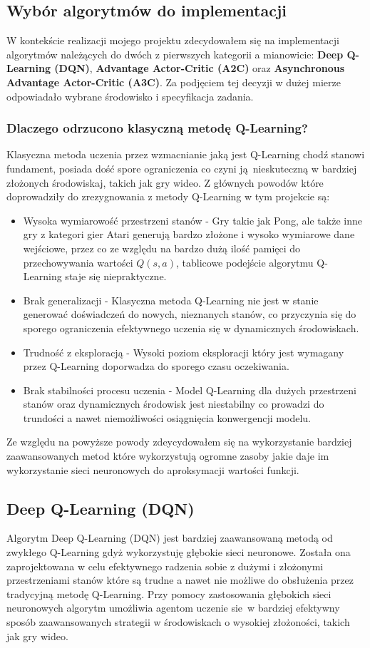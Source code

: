 \documentclass[a4paper, 10pt]{article}
\begin{document}
    \subsection{Wybór algorytmów do implementacji}
    W kontekście realizacji mojego projektu zdecydowałem się na implementacji algorytmów należących do dwóch z pierwszych kategorii a mianowicie:
    \textbf{Deep Q-Learning (DQN)}, \textbf{Advantage Actor-Critic (A2C)} oraz \textbf{Asynchronous Advantage Actor-Critic (A3C)}.
    Za podjęciem tej decyzji w dużej mierze odpowiadało wybrane środowisko i specyfikacja zadania.
    \subsubsection{Dlaczego odrzucono klasyczną metodę Q-Learning?}
    Klasyczna metoda uczenia przez wzmacnianie jaką jest Q-Learning chodź stanowi fundament, posiada dość spore ograniczenia co 
    czyni ją nieskuteczną w bardziej złożonych środowiskaj, takich jak gry wideo. Z głównych powodów które doprowadziły 
    do zrezygnowania z metody Q-Learning w tym projekcie są:
    \begin{itemize}
        \item Wysoka wymiarowość przestrzeni stanów - Gry takie jak Pong, ale także inne gry z kategori gier Atari generują bardzo złożone 
        i wysoko wymiarowe dane wejściowe, przez co ze względu na bardzo dużą ilość pamięci do przechowywania wartości \( Q(s,a) \),
        tablicowe podejście algorytmu Q-Learning staje się niepraktyczne.
        \item Brak generalizacji - Klasyczna metoda Q-Learning nie jest w stanie generować doświadczeń do nowych, nieznanych stanów, co 
        przyczynia się do sporego ograniczenia efektywnego uczenia się w dynamicznych środowiskach.
        \item Trudność z eksploracją - Wysoki poziom eksploracji który jest wymagany przez Q-Learning doporwadza do sporego czasu oczekiwania.
        \item Brak stabilności procesu uczenia - Model Q-Learning dla dużych przestrzeni stanów oraz dynamicznych środowisk jest niestabilny co prowadzi
        do trundości a nawet niemożliwości osiągnięcia konwergencji modelu. 
    \end{itemize}
    Ze względu na powyższe powody zdeycydowałem się na wykorzystanie bardziej zaawansowanych metod które wykorzystują ogromne zasoby jakie daje im 
    wykorzystanie sieci neuronowych do aproksymacji wartości funkcji.
    \subsection{Deep Q-Learning (DQN)}
    Algorytm Deep Q-Learning (DQN) jest bardziej zaawansowaną metodą od zwykłego Q-Learning gdyż wykorzystuję głębokie sieci neuronowe.
    Została ona zaprojektowana w celu efektywnego radzenia sobie z dużymi i złożonymi przestrzeniami stanów które są trudne a nawet nie możliwe
    do obsłużenia przez tradycyjną metodę Q-Learning. Przy pomocy zastosowania głębokich sieci neuronowych algorytm umożliwia agentom
    uczenie sie w bardziej efektywny sposób zaawansowanych strategii w środowiskach o wysokiej złożoności, takich jak gry wideo.
\end{document}
